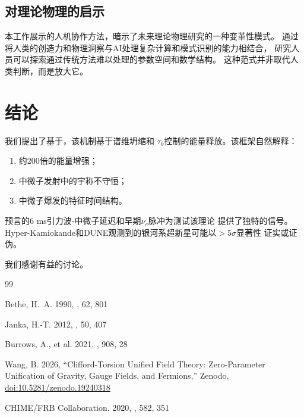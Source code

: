 \documentclass[twocolumn, tightenlines, showpacs, showkeys, nofootinbib]{revtex4-1}
\newcommand{\ctuft}{\textsc{CTUFT}}
\newcommand{\tauzero}{\tau_0}
\begin{document}
\subsection{对理论物理的启示}

本工作展示的人机协作方法，暗示了未来理论物理研究的一种变革性模式。
通过将人类的创造力和物理洞察与AI处理复杂计算和模式识别的能力相结合，
研究人员可以探索通过传统方法难以处理的参数空间和数学结构。
这种范式并非取代人类判断，而是放大它。

\section{结论}
\label{sec:conclusions}

我们提出了基于，该机制基于谱维坍缩和
$\tauzero$控制的能量释放。该框架自然解释：
\begin{enumerate}
    \item 约200倍的能量增强；
    \item 中微子发射中的宇称不守恒；
    \item 中微子爆发的特征时间结构。
\end{enumerate}

预言的6 ms引力波-中微子延迟和早期$\nu_e$脉冲为测试该理论
提供了独特的信号。
Hyper-Kamiokande和DUNE观测到的银河系超新星可能以$>5\sigma$显著性
证实或证伪。

\begin{acknowledgments}
我们感谢有益的讨论。
\end{acknowledgments}


\begin{thebibliography}{99}

Bethe, H.~A. 1990, \revmp, 62, 801

Janka, H.-T. 2012, \araa, 50, 407

Burrows, A., et al. 2021, \apj, 908, 28

Wang, B. 2026, ``Clifford-Torsion Unified Field Theory: 
Zero-Parameter Unification of Gravity, Gauge Fields, and Fermions,'' 
Zenodo, \href{https://doi.org/10.5281/zenodo.19240318}{doi:10.5281/zenodo.19240318}

CHIME/FRB Collaboration. 2020, \nat, 582, 351

\end{thebibliography}
\end{document}
